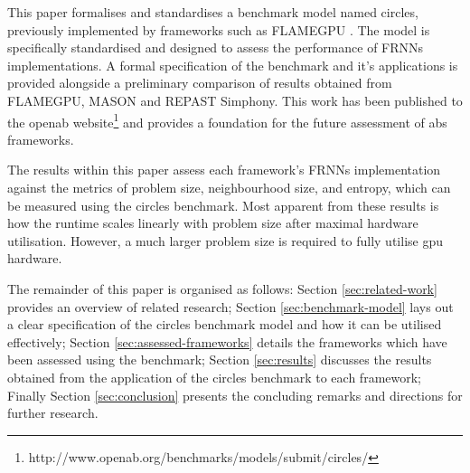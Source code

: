  This paper formalises and standardises a benchmark model named circles, previously implemented by frameworks such as FLAMEGPU \cite{RR082}. The model is specifically standardised and designed to assess the performance of FRNNs implementations. A formal specification of the benchmark and it's applications is provided alongside a preliminary comparison of results obtained from FLAMEGPU, MASON and REPAST Simphony. This work has been published to the \gls{openab} website\footnote{http://www.openab.org/benchmarks/models/submit/circles/} and provides a foundation for the future assessment of \gls{abs} frameworks.
  
  The results within this paper assess each framework’s FRNNs implementation against the metrics of problem size, neighbourhood size, and entropy, which can be measured using the circles benchmark. Most apparent from these results is how the runtime scales linearly with problem size after maximal hardware utilisation. However, a much larger problem size is required to fully utilise \gls{gpu} hardware.
  
  The remainder of this paper is organised as follows: Section \ref{sec:related-work} provides an overview of related research; Section \ref{sec:benchmark-model} lays out a clear specification of the circles benchmark model and how it can be utilised effectively; Section \ref{sec:assessed-frameworks} details the frameworks which have been assessed using the benchmark; Section \ref{sec:results} discusses the results obtained from the application of the circles benchmark to each framework; Finally Section \ref{sec:conclusion} presents the concluding remarks and directions for further research.